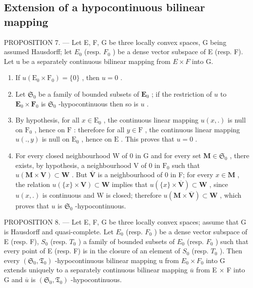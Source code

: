 \subsection{Extension of a hypocontinuous bilinear mapping}

PROPOSITION 7. --- Let E, F, G be three locally convex spaces, G being assumed Hausdorff; let \(E_{0}\) (resp. \(F_{0}\) ) be a dense vector subspace of E (resp. F). Let u be a separately continuous bilinear mapping from \(E \times F\) into G.

\begin{enumerate}
\def\labelenumi{\arabic{enumi})}
\item
  If \(u(\mathrm{E}_0 \times \mathrm{F}_0) = \{0\}\) , then \(u = 0\) .
\item
  Let \(\mathfrak{S}_0\) be a family of bounded subsets of \(\mathbf{E}_0\) ; if the restriction of \(u\) to \(\mathbf{E}_0 \times \mathbf{F}_0\) is \(\mathfrak{S}_0\) -hypocontinuous then so is \(u\) .
\item
  By hypothesis, for all \(x \in \mathrm{E}_0\) , the continuous linear mapping \(u(x, .)\) is null on \(\mathrm{F}_0\) , hence on \(\mathrm{F}\) : therefore for all \(y \in \mathrm{F}\) , the continuous linear mapping \(u(., y)\) is null on \(\mathrm{E}_0\) , hence on \(\mathrm{E}\) . This proves that \(u = 0\) .
\item
  For every closed neighbourhood W of 0 in G and for every set \(\mathbf{M} \in \mathfrak{S}_0\) , there exists, by hypothesis, a neighbourhood V of 0 in \(\mathrm{F}_0\) such that \(u(\mathbf{M} \times \mathbf{V}) \subset \mathbf{W}\) . But \(\overline{\mathbf{V}}\) is a neighbourhood of 0 in F; for every \(x \in \mathbf{M}\) , the relation \(u(\{x\} \times \mathbf{V}) \subset \mathbf{W}\) implies that \(u(\{x\} \times \overline{\mathbf{V}}) \subset \mathbf{W}\) , since \(u(x, .)\) is continuous and W is closed; therefore \(u(\mathbf{M} \times \overline{\mathbf{V}}) \subset \mathbf{W}\) , which proves that \(u\) is \(\mathfrak{S}_0\) -hypocontinuous.
\end{enumerate}

PROPOSITION 8. --- Let E, F, G be three locally convex spaces; assume that G is Hausdorff and quasi-complete. Let \(E_{0}\) (resp. \(F_{0}\) ) be a dense vector subspace of E (resp. F), \(S_{0}\) (resp. \(T_{0}\) ) a family of bounded subsets of \(E_{0}\) (resp. \(F_{0}\) ) such that every point of E (resp. F) is in the closure of an element of \(S_{0}\) (resp. \(T_{0}\) ). Then every \((\mathfrak{S}_{0}, \mathfrak{T}_{0})\) -hypocontinuous bilinear mapping u from \(E_{0} \times F_{0}\) into G extends uniquely to a separately continuous bilinear mapping \(\overline{u}\) from E × F into G and \(\overline{u}\) is \((\mathfrak{S}_{0}, \mathfrak{T}_{0})\) -hypocontinuous.

